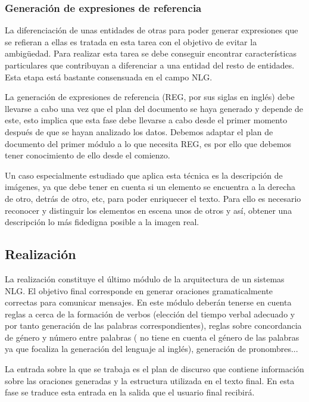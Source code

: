 \subsubsection{Generación de expresiones de referencia}
La diferenciación de unas entidades de otras para poder generar expresiones que se refieran a ellas es tratada en esta tarea con el objetivo de evitar la ambigüedad. Para realizar esta tarea se debe conseguir encontrar características particulares que contribuyan a diferenciar a una entidad del resto de entidades. Esta etapa está bastante consensuada en el campo NLG. 

La generación de expresiones de referencia (REG, por sus siglas en inglés) debe llevarse a cabo una vez que el plan del documento se haya generado y depende de este, esto implica que esta fase debe llevarse a cabo desde el primer momento después de que se hayan analizado los datos. Debemos adaptar el plan de documento del primer módulo a lo que necesita REG, es por ello que debemos tener conocimiento de ello desde el comienzo.

Un caso especialmente estudiado que aplica esta técnica es la descripción de imágenes, ya que debe tener en cuenta si un elemento se encuentra a la derecha de otro, detrás de otro, etc, para poder enriquecer el texto. Para ello es necesario reconocer y distinguir los elementos en escena unos de otros y así, obtener una descripción lo más fidedigna posible a la imagen real.

\subsection{Realización}
La realización constituye el último módulo de la arquitectura de un sistemas NLG. El objetivo final corresponde en generar oraciones gramaticalmente correctas para comunicar mensajes. En este módulo deberán tenerse en cuenta reglas a cerca de la formación de verbos (elección del tiempo verbal adecuado y por tanto generación de las palabras correspondientes), reglas sobre concordancia de género y número entre palabras (\cite{reiter1997building} no tiene en cuenta el género de las palabras ya que focaliza la generación del lenguaje al inglés), generación de pronombres...
 
La entrada sobre la que se trabaja es el plan de discurso que contiene información sobre las oraciones generadas y la estructura utilizada en el texto final. En esta fase se traduce esta entrada en la salida que el usuario final recibirá.

